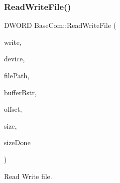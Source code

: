 \subsubsection{\texorpdfstring{Read\+Write\+File()}{ReadWriteFile()}}
{\footnotesize\ttfamily D\+W\+O\+RD Base\+Com\+::\+Read\+Write\+File (\begin{DoxyParamCaption}\item[{B\+O\+OL}]{write,  }\item[{B\+O\+OL}]{device,  }\item[{B\+S\+TR}]{file\+Path,  }\item[{B\+S\+TR $\ast$}]{buffer\+Bstr,  }\item[{unsigned \+\_\+\+\_\+int64}]{offset,  }\item[{unsigned \+\_\+\+\_\+int32}]{size,  }\item[{D\+W\+O\+RD $\ast$}]{size\+Done }\end{DoxyParamCaption})\hspace{0.3cm}{\ttfamily [static]}}



Read Write file. 


